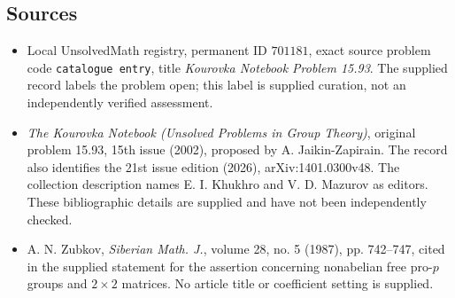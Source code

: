 \documentclass[11pt]{article}
\begin{document}
\subsection{Sources}
\begin{itemize}
\item Local UnsolvedMath registry, permanent ID \(701181\), exact source problem code \texttt{catalogue entry}, title \emph{Kourovka Notebook Problem 15.93}. The supplied record labels the problem open; this label is supplied curation, not an independently verified assessment.
\item \emph{The Kourovka Notebook (Unsolved Problems in Group Theory)}, original problem 15.93, 15th issue (2002), proposed by A. Jaikin-Zapirain. The record also identifies the 21st issue edition (2026), arXiv:1401.0300v48. The collection description names E. I. Khukhro and V. D. Mazurov as editors. These bibliographic details are supplied and have not been independently checked.
\item A. N. Zubkov, \emph{Siberian Math. J.}, volume 28, no. 5 (1987), pp. 742--747, cited in the supplied statement for the assertion concerning nonabelian free pro-\(p\) groups and \(2\times2\) matrices. No article title or coefficient setting is supplied.
\end{itemize}
\end{document}

